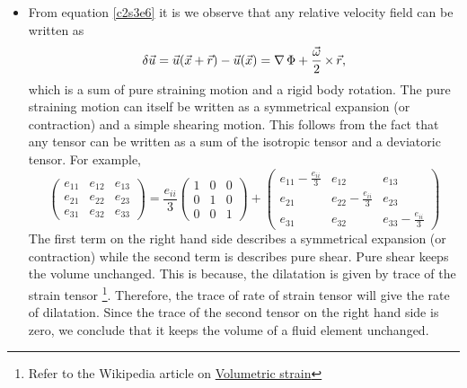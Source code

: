 \begin{itemize}
\item From equation \eqref{c2s3e6} it is we observe that any relative velocity field can be written as
\[
\delta\vec{u} = \vec{u}(\vec{x} + \vec{r}) - \vec{u}(\vec{x}) = \operatorname{\nabla}{\Phi} + \frac{\vec{\omega}}{2} \operatorname{\times} \vec{r},
\]
which is a sum of pure straining motion and a rigid body rotation. The pure straining motion can itself be written as a symmetrical expansion (or contraction) and  a simple shearing 
motion. This follows from the fact that any tensor can be written as a sum of the isotropic tensor and a deviatoric tensor. For example,
\[
\begin{pmatrix}
e_{11} & e_{12} & e_{13} \\
e_{21} & e_{22} & e_{23} \\
e_{31} & e_{32} & e_{33}
\end{pmatrix}
=
\frac{e_{ii}}{3}\begin{pmatrix}
1 & 0 & 0 \\
0 & 1 & 0 \\
0 & 0 & 1
\end{pmatrix} 
+
\begin{pmatrix}
e_{11} - \frac{e_{ii}}{3} & e_{12} & e_{13} \\
e_{21} & e_{22} - \frac{e_{ii}}{3} & e_{23} \\
e_{31} & e_{32} & e_{33} - \frac{e_{ii}}{3}
\end{pmatrix}
\]
The first term on the right hand side describes a symmetrical expansion (or contraction) while the second term is describes pure shear. Pure shear keeps the volume unchanged. This is
because, the dilatation is given by trace of the strain tensor \footnote{Refer to the Wikipedia article on 
\href{https://en.wikipedia.org/wiki/Infinitesimal_strain_theory\#Volumetric_strain}{Volumetric strain}}. Therefore, the trace of rate of strain tensor will give the rate of dilatation.
Since the trace of the second tensor on the right hand side is zero, we conclude that it keeps the volume of a fluid element unchanged.
\end{itemize}

